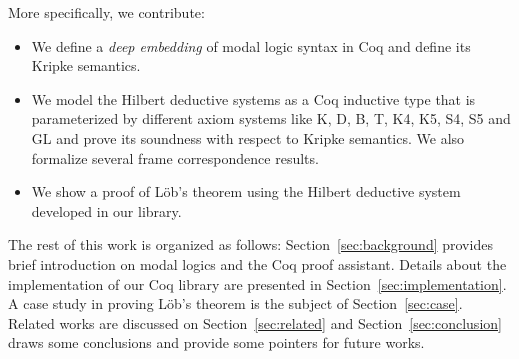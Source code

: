 \documentclass[sigconf]{acmart}
\begin{document}


More specifically, we contribute:

\begin{itemize}
  \item We define a \emph{deep embedding} of modal logic syntax in Coq and
    define its Kripke semantics.
  \item We model the Hilbert deductive systems as a Coq inductive type that is
    parameterized by different axiom systems like K, D, B, T, K4, K5, S4, S5 and GL
    and prove its soundness with respect to Kripke semantics.
    We also formalize several frame correspondence results.
  \item We show a proof of L\"ob's theorem using the Hilbert deductive system
    developed in our library.
\end{itemize}

The rest of this work is organized as follows: Section~\ref{sec:background} provides
brief introduction on modal logics and the Coq proof assistant. Details about
the implementation of our Coq library are presented in
Section~\ref{sec:implementation}. A case study in proving L\"ob's theorem is
the subject of Section~\ref{sec:case}. Related works are discussed
on Section~\ref{sec:related} and Section~\ref{sec:conclusion} draws some conclusions and
provide some pointers for future works.
\end{document}
